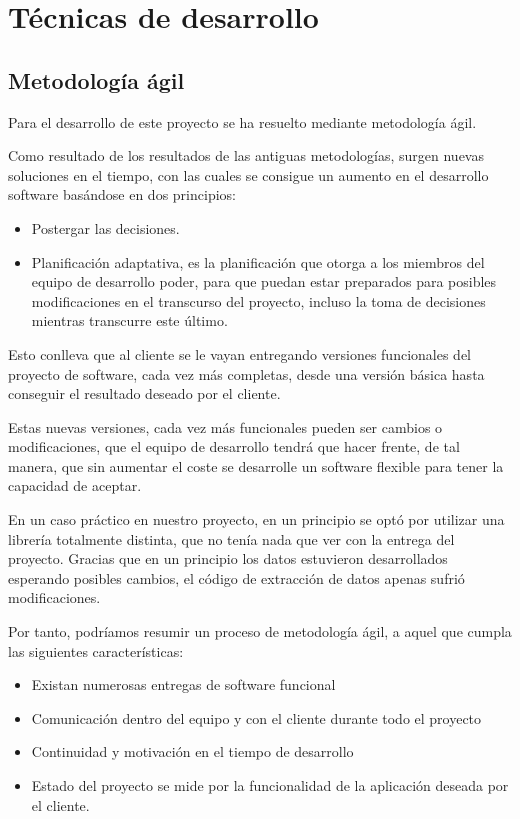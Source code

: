 
\section{Técnicas de desarrollo}

\subsection{Metodología ágil}

Para el desarrollo de este proyecto se ha resuelto mediante metodología ágil.


Como resultado de los resultados de las antiguas metodologías, surgen nuevas soluciones en el tiempo, con las cuales se consigue un aumento en el desarrollo software basándose en dos principios:\cite{MAgil}

\begin{itemize}
	\item Postergar las decisiones.
	\item Planificación adaptativa, es la planificación que otorga a los miembros del equipo de desarrollo poder, para que puedan estar preparados para posibles modificaciones en el transcurso del proyecto, incluso la toma de decisiones mientras transcurre este último. 
\end{itemize}

Esto conlleva que al cliente se le vayan entregando versiones funcionales del proyecto de software, cada vez más completas, desde una versión básica hasta conseguir el resultado deseado por el cliente.

Estas nuevas versiones, cada vez más funcionales pueden ser cambios o modificaciones, que el equipo de desarrollo tendrá que hacer frente, de tal manera, que sin aumentar el coste se desarrolle un software flexible para tener la capacidad de aceptar.

En un caso práctico en nuestro proyecto, en un principio se optó por utilizar una librería totalmente distinta, que no tenía nada que ver con la entrega del proyecto. Gracias que en un principio los datos estuvieron desarrollados esperando posibles cambios, el código de extracción de datos apenas sufrió modificaciones.

Por tanto, podríamos resumir un proceso de metodología ágil, a aquel que cumpla las siguientes características:
\begin{itemize}
	\item Existan numerosas entregas de software funcional
	\item Comunicación dentro del equipo y con el cliente durante todo el proyecto
	\item Continuidad y motivación en el tiempo de desarrollo
	\item Estado del proyecto se mide por la funcionalidad de la aplicación deseada por el cliente.

\end{itemize}


